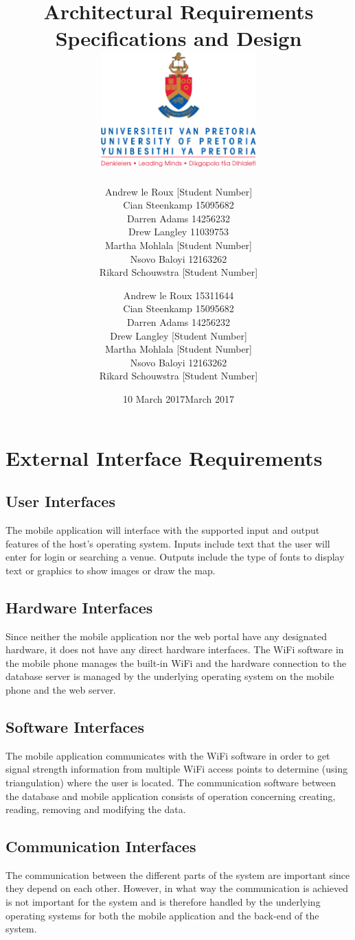 \documentclass{article}
\title{ Architectural Requirements Specifications and Design \\[0.5cm] \includegraphics[width=6cm]{front-page}}
\author{Andrew le Roux \hfill [Student Number] \\ Cian Steenkamp \hfill 15095682 \\ Darren Adams \hfill 14256232 \\ Drew Langley \hfill 11039753 \\ Martha Mohlala \hfill [Student Number] \\ Nsovo Baloyi \hfill 12163262 \\ Rikard Schouwstra \hfill [Student Number]}
\date{10 March 2017}
\author{Andrew le Roux \hfill 15311644 \\ Cian Steenkamp \hfill 15095682 \\ Darren Adams \hfill 14256232 \\ Drew Langley \hfill [Student Number] \\ Martha Mohlala \hfill [Student Number] \\ Nsovo Baloyi \hfill 12163262 \\ Rikard Schouwstra \hfill [Student Number]}
\date{March 2017}
\begin{document}
\maketitle
\pagebreak
\tableofcontents
\pagebreak

\section{External Interface Requirements}
    \subsection{User Interfaces}
        The mobile application will interface with the supported input and output
        features of the host's operating system. Inputs include text that the user
        will enter for login or searching a venue. Outputs include the type of fonts
        to display text or graphics to show images or draw the map.

    \subsection{Hardware Interfaces}
        Since neither the mobile application nor the web portal have any designated
        hardware, it does not have any direct hardware interfaces. The WiFi software
        in the mobile phone manages the built-in WiFi and the hardware connection
        to the database server is managed by the underlying operating system on the
        mobile phone and the web server.

    \subsection{Software Interfaces}
        The mobile application communicates with the WiFi software in order to get
        signal strength information from multiple WiFi access points to determine
        (using triangulation) where the user is located. The communication software
        between the database and mobile application consists of operation concerning
        creating, reading, removing and modifying the data.

    \subsection{Communication Interfaces}
        The communication between the different parts of the system are important since they depend on each other. However, in what way the communication is achieved is not important for the system and is therefore handled by the underlying operating systems for both the mobile application and the back-end of the system.
\end{document}
